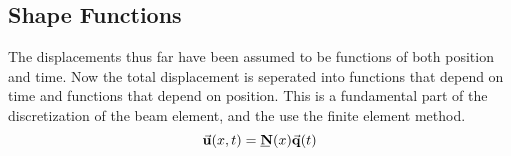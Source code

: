 \subsection{Shape Functions}
The displacements thus far have been assumed to be functions of both position and time. Now the total displacement is seperated into functions that depend on time and functions that depend on position. This is a fundamental part of the discretization of the beam element, and the use the finite element method. 
\begin{equation} \label{eq:FEGoverning}
\vec{\mathbf{u}}(x,t)=\bunderline{\mathbf{N}}(x)\vec{\mathbf{q}}(t)
\end{equation}


